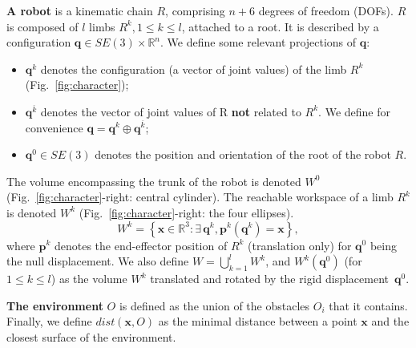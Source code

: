 \medskip
\textbf{A robot} is a kinematic chain $R$, comprising \mbox{$n + 6$} degrees of freedom (DOFs).
$R$ is composed of $l$ limbs $R^k, 1 \leq k \leq l$, attached to a root.
It is described by a configuration $\mathbf{q} \in SE(3) \times \mathbb{R}^n$.
We define some relevant projections of $\mathbf{q}$:
\begin{itemize}
	\item $\mathbf{q}^k$ denotes the configuration (a vector of joint values) of the limb $R^k$ (Fig.~\ref{fig:character});
	\item $\mathbf{q}^{\overline{k}}$ denotes the vector of joint values of R \textbf{not} related to $R^k$. We define for convenience \mbox{$\mathbf{q}= \mathbf{q}^k \oplus \mathbf{q}^{\overline{k}}$}; %
	\item $\mathbf{q}^{0}\in SE(3)$ denotes the position and orientation of the root of the robot $R$.
\end{itemize}

\medskip
The volume encompassing the trunk of the robot is denoted $W^0$ (Fig.~\ref{fig:character}-right: central cylinder). The reachable workspace of a limb $R^k$ is denoted $W^k$ (Fig.~\ref{fig:character}-right: the four ellipses). 
\begin{equation}
  W^k = \left\{ {\mathbf{x} \in \mathbb{R}^3: \exists \, \mathbf{q}^k, \mathbf{p}^k(\mathbf{q}^k) = \mathbf{x} } \right\},
\end{equation}
where $\mathbf{p}^k$ denotes the end-effector position of $R^k$ (translation only) for $\mathbf{q}^0$ being the null displacement. We also define $W = \bigcup_{k=1}^{l}W^k$, and
$W^k(\mathbf{q}^{0})$ (for $1 \leq k \leq l$) as the volume $W^k$ translated and rotated by the rigid displacement~$\mathbf{q}^{0}$.

\medskip
\textbf{The environment} $O$ is defined as the union of the obstacles $O_i$ that it contains.
Finally, we define $dist(\mathbf{x}, O)$ as the minimal distance between a point $\mathbf{x}$ and the closest surface of the environment.
